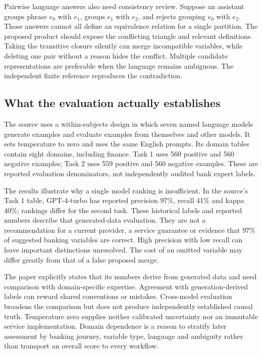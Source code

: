Pairwise language answers also need consistency review. Suppose an assistant groups phrase $e_0$ with $e_1$, groups $e_1$ with $e_2$, and rejects grouping $e_0$ with $e_2$. Those answers cannot all define an equivalence relation for a single partition. The proposed product should expose the conflicting triangle and relevant definitions. Taking the transitive closure silently can merge incompatible variables, while deleting one pair without a reason hides the conflict. Multiple candidate representations are preferable when the language remains ambiguous. The independent finite reference reproduces the contradiction.\citep{exec28_cm_reference}

\subsection{What the evaluation actually establishes}

The source uses a within-subjects design in which seven named language models generate examples and evaluate examples from themselves and other models. It sets temperature to zero and uses the same English prompts. Its domain tables contain eight domains, including finance. Task 1 uses 560 positive and 560 negative examples; Task 2 uses 559 positive and 560 negative examples. These are reported evaluation denominators, not independently audited bank expert labels.\citep{exec28_cm_razouk}

The results illustrate why a single model ranking is insufficient. In the source's Task 1 table, GPT-4-turbo has reported precision 97\%, recall 41\% and kappa 40\%; rankings differ for the second task. These historical labels and reported numbers describe that generated-data evaluation. They are not a recommendation for a current provider, a service guarantee or evidence that 97\% of suggested banking variables are correct. High precision with low recall can leave important distinctions unresolved. The cost of an omitted variable may differ greatly from that of a false proposed merge.\citep{exec28_cm_razouk}

The paper explicitly states that its numbers derive from generated data and need comparison with domain-specific expertise. Agreement with generation-derived labels can reward shared conventions or mistakes. Cross-model evaluation broadens the comparison but does not produce independently established causal truth. Temperature zero supplies neither calibrated uncertainty nor an immutable service implementation. Domain dependence is a reason to stratify later assessment by banking journey, variable type, language and ambiguity rather than transport an overall score to every workflow.

